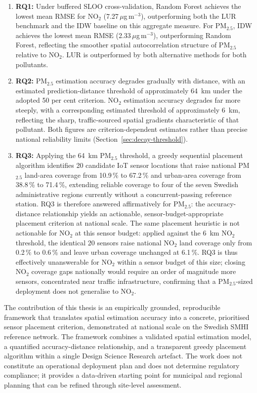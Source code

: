 \documentclass[11pt,a4paper]{article}
\begin{document}
\begin{enumerate}
    \item \textbf{RQ1:} Under buffered SLOO cross-validation, Random Forest achieves the lowest mean RMSE for NO$_2$ (7.27\,$\mu$g\,m$^{-3}$), outperforming both the LUR benchmark and the IDW baseline on this aggregate measure. For PM$_{2.5}$, IDW achieves the lowest mean RMSE (2.33\,$\mu$g\,m$^{-3}$), outperforming Random Forest, reflecting the smoother spatial autocorrelation structure of PM$_{2.5}$ relative to NO$_2$. LUR is outperformed by both alternative methods for both pollutants.
    \item \textbf{RQ2:} PM$_{2.5}$ estimation accuracy degrades gradually with distance, with an estimated prediction-distance threshold of approximately 64~km under the adopted 50 per cent criterion. NO$_2$ estimation accuracy degrades far more steeply, with a corresponding estimated threshold of approximately 6~km, reflecting the sharp, traffic-sourced spatial gradients characteristic of that pollutant. Both figures are criterion-dependent estimates rather than precise national reliability limits (Section~\ref{sec:decay-threshold}).
    \item \textbf{RQ3:} Applying the 64~km PM$_{2.5}$ threshold, a greedy sequential placement algorithm identifies 20 candidate IoT sensor locations that raise national PM$_{2.5}$ land-area coverage from 10.9\,\% to 67.2\,\% and urban-area coverage from 38.8\,\% to 71.4\,\%, extending reliable coverage to four of the seven Swedish administrative regions currently without a concurrent-passing reference station. RQ3 is therefore answered affirmatively for PM$_{2.5}$: the accuracy-distance relationship yields an actionable, sensor-budget-appropriate placement criterion at national scale. The same placement heuristic is not actionable for NO$_2$ at this sensor budget: applied against the 6~km NO$_2$ threshold, the identical 20 sensors raise national NO$_2$ land coverage only from 0.2\,\% to 0.6\,\% and leave urban coverage unchanged at 6.1\,\%. RQ3 is thus effectively unanswerable for NO$_2$ within a sensor budget of this size; closing NO$_2$ coverage gaps nationally would require an order of magnitude more sensors, concentrated near traffic infrastructure, confirming that a PM$_{2.5}$-sized deployment does not generalise to NO$_2$.
\end{enumerate}

The contribution of this thesis is an empirically grounded, reproducible framework that translates spatial estimation accuracy into a concrete, prioritised sensor placement criterion, demonstrated at national scale on the Swedish SMHI reference network. The framework combines a validated spatial estimation model, a quantified accuracy-distance relationship, and a transparent greedy placement algorithm within a single Design Science Research artefact. The work does not constitute an operational deployment plan and does not determine regulatory compliance; it provides a data-driven starting point for municipal and regional planning that can be refined through site-level assessment.
\end{document}
